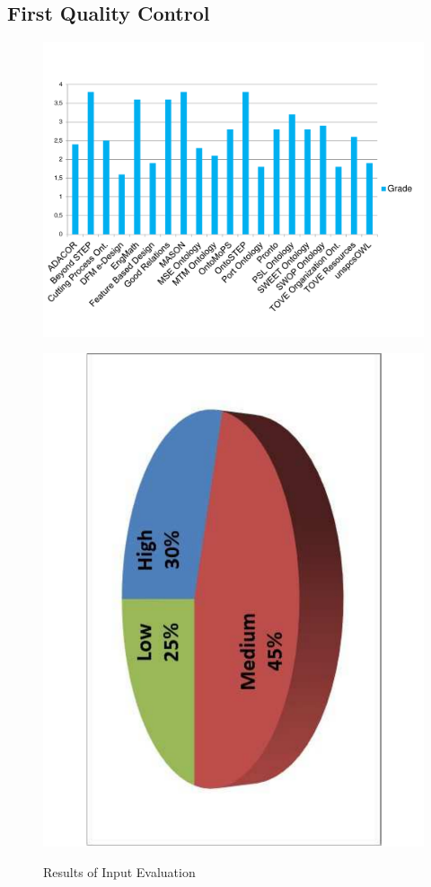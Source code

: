 \subsection{First Quality Control}\label{subsection4.2.2}


\begin{figure}
	\centering
	\scriptsize
	\begin{minipage}{.5\textwidth}
		\includegraphics[scale=0.3]{figure-chapterIV/fig4-1.pdf}\\
		\caption{Results of Input Evaluation}
		\label{figure4-1}
	\end{minipage}%
	\begin{minipage}{.5\textwidth}
		\includegraphics[scale=0.3, angle=270]{figure-chapterIV/fig4-2.pdf}\\

\end{minipage}
\end{figure}
